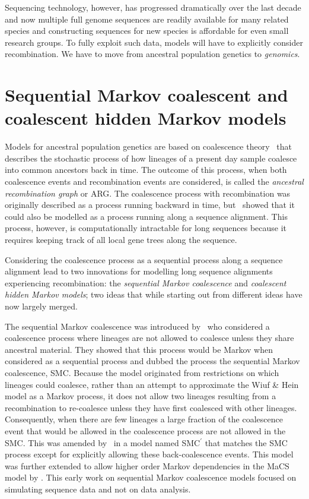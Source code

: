 Sequencing technology, however, has progressed dramatically over the last decade and now multiple full genome sequences are readily available for many related species and constructing sequences for new species is affordable for even small research groups. To fully exploit such data, models will have to explicitly consider recombination. We have to move from ancestral population genetics to \emph{genomics}.


\section{Sequential Markov coalescent and coalescent hidden Markov models}

Models for ancestral population genetics are based on coalescence theory~\cite{Hein:2005vz} that describes the stochastic process of how lineages of a present day sample coalesce into common ancestors back in time. The outcome of this process, when both coalescence events and recombination events are considered, is called the \emph{ancestral recombination graph} or ARG. The coalescence process with recombination was originally described as a process running backward in time, but~\citet{Wiuf:1999gu} showed that it could also be modelled as a process running along a sequence alignment. This process, however, is computationally intractable for long sequences because it requires keeping track of all local gene trees along the sequence.

Considering the coalescence process as a sequential process along a sequence alignment lead to two innovations for modelling long sequence alignments experiencing recombination: the \emph{sequential Markov coalescence} and \emph{coalescent hidden Markov models}; two ideas that while starting out from different ideas have now largely merged.

The sequential Markov coalescence was introduced by~\citet{McVean:2005ho} who considered a coalescence process where lineages are not allowed to coalesce unless they share ancestral material. They showed that this process would be Markov when considered as a sequential process and dubbed the process the sequential Markov coalescence, SMC. Because the model originated from restrictions on which lineages could coalesce, rather than an attempt to approximate the Wiuf \& Hein model as a Markov process, it does not allow two lineages resulting from a recombination to re-coalesce unless they have first coalesced with other lineages. Consequently, when there are few lineages a large fraction of the coalescence event that would be allowed in the coalescence process are not allowed in the SMC. This was amended by~\citet{Marjoram:2006hp} in a model named SMC$^\prime$ that matches the SMC process except for explicitly allowing these back-coalescence events. This model was further extended to allow higher order Markov dependencies in the MaCS model by \citet{Chen:2009fg}. This early work on sequential Markov coalescence models focused on simulating sequence data and not on data analysis.

